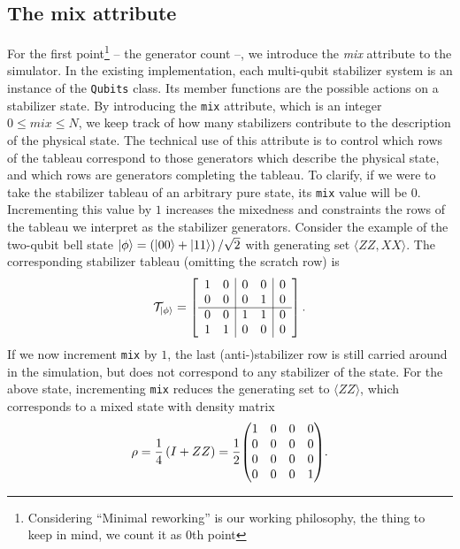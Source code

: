 \subsection{The mix attribute}
%
For the first point\footnote{Considering \enquote{Minimal reworking} is our
working philosophy, the thing to keep in mind, we count it as $0$th point}  --
the generator count --, we introduce the \emph{mix} attribute to the simulator.
In the existing implementation, each multi-qubit stabilizer system is an
instance of the \texttt{Qubits} class. Its member functions are the possible
actions on a stabilizer state. By introducing the \verb|mix| attribute, which
is an integer $0\leq mix \leq N$, we keep track of how many stabilizers
contribute to the description of the physical state. The technical use of this
attribute is to control which rows of the tableau correspond to those
generators which describe the physical state, and which rows are generators
completing the tableau. To clarify, if we were to take the stabilizer tableau
of an arbitrary pure state, its \verb|mix| value will be $0$. Incrementing this
value by $1$ increases the mixedness and constraints the rows of the tableau we
interpret as the stabilizer generators. Consider the example of the two-qubit
bell state $\ket{\phi} = \left( \ket{00} + \ket{11} \right) /\sqrt{2}$ with
generating set $\langle ZZ, XX\rangle$. The corresponding stabilizer tableau
(omitting the scratch row) is
\begin{align}
\mathcal{T}_{\ket{\phi}} = 
  \left[
    \begin{array}{cc|cc|c}
      1 & 0 & 0 & 0 & 0 \\
      0 & 0 & 0 & 1 & 0 \\ \hline
      0 & 0 & 1 & 1 & 0 \\
      1 & 1 & 0 & 0 & 0 \\ 
    \end{array}
  \right]
.\end{align}
If we now increment \verb|mix| by $1$, the last (anti-)stabilizer row is still
carried around in the simulation, but does not correspond to any stabilizer of
the state. For the above state, incrementing \verb|mix| reduces the generating
set to $\langle ZZ \rangle$, which corresponds to a mixed state with density
matrix
\begin{align}\label{eq:sample-mixedstate}
  \rho = \frac{1}{4}\left( I + ZZ \right) = \frac{1}{2}\mqty(\dmat[0]{1,0,0,1})
.\end{align}
